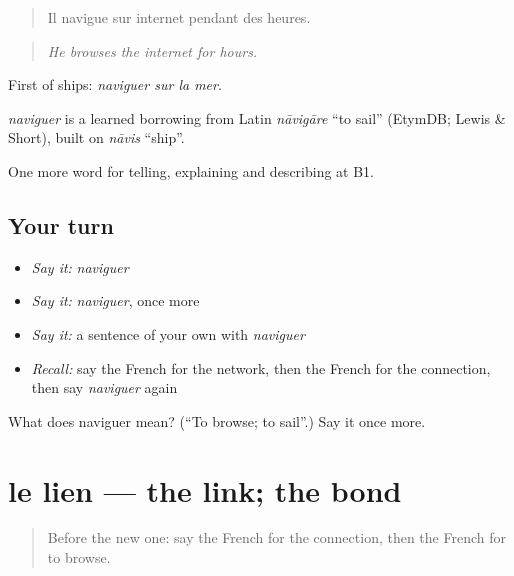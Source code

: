 \begin{quote}
Il navigue sur internet pendant des heures.
\end{quote}

\begin{quote}
\emph{He browses the internet for hours.}
\end{quote}

First of ships: \emph{naviguer sur la mer}.

\begin{cousinweb}
\emph{naviguer} is a learned borrowing from Latin \emph{nāvigāre} \textquotedblleft{}to sail\textquotedblright{} (EtymDB; Lewis \& Short), built on \emph{nāvis} \textquotedblleft{}ship\textquotedblright{}.
\end{cousinweb}

\begin{grammarlens}[title={What you've built}]
One more word for telling, explaining and describing at B1.
\end{grammarlens}

\subsection*{Your turn}
\begin{itemize}
\raggedright
  \item \emph{Say it:} \emph{naviguer}
  \item \emph{Say it:} \emph{naviguer}, once more
  \item \emph{Say it:} a sentence of your own with \emph{naviguer}
  \item \emph{Recall:} say the French for the network, then the French for the connection, then say \emph{naviguer} again
\end{itemize}

\begin{tcolorbox}[breakable,colback=teal!4,colframe=teal!35!black,title={Before you move on}]
What does naviguer mean? (\textquotedblleft{}To browse; to sail\textquotedblright{}.) Say it once more.
\end{tcolorbox}
\section[le lien]{le lien — the link; the bond}

\label{lesson:FR-C398-lien}



\begin{quote}
Before the new one: say the French for the connection, then the French for to browse.
\end{quote}

